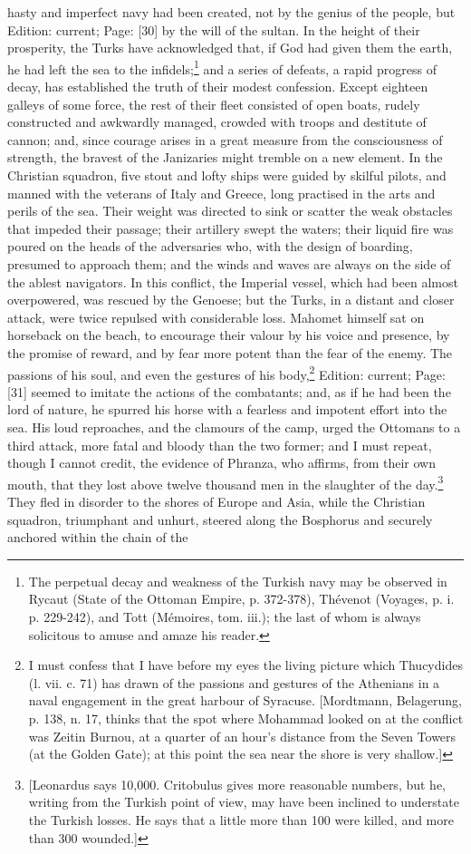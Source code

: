 hasty and imperfect navy had been created, not by the genius of the people, but Edition: current; Page: [30] by the will of the sultan. In the height of their prosperity, the Turks have acknowledged that, if God had given them the earth, he had left the sea to the infidels;\footnote{The perpetual decay and weakness of the Turkish navy may be observed in Rycaut (State of the Ottoman Empire, p. 372-378), Thévenot (Voyages, p. i. p. 229-242), and Tott (Mémoires, tom. iii.); the last of whom is always solicitous to amuse and amaze his reader.} and a series of defeats, a rapid progress of decay, has established the truth of their modest confession. Except eighteen galleys of some force, the rest of their fleet consisted of open boats, rudely constructed and awkwardly managed, crowded with troops and destitute of cannon; and, since courage arises in a great measure from the consciousness of strength, the bravest of the Janizaries might tremble on a new element. In the Christian squadron, five stout and lofty ships were guided by skilful pilots, and manned with the veterans of Italy and Greece, long practised in the arts and perils of the sea. Their weight was directed to sink or scatter the weak obstacles that impeded their passage; their artillery swept the waters; their liquid fire was poured on the heads of the adversaries who, with the design of boarding, presumed to approach them; and the winds and waves are always on the side of the ablest navigators. In this conflict, the Imperial vessel, which had been almost overpowered, was rescued by the Genoese; but the Turks, in a distant and closer attack, were twice repulsed with considerable loss. Mahomet himself sat on horseback on the beach, to encourage their valour by his voice and presence, by the promise of reward, and by fear more potent than the fear of the enemy. The passions of his soul, and even the gestures of his body,\footnote{I must confess that I have before my eyes the living picture which Thucydides (l. vii. c. 71) has drawn of the passions and gestures of the Athenians in a naval engagement in the great harbour of Syracuse. [Mordtmann, Belagerung, p. 138, n. 17, thinks that the spot where Mohammad looked on at the conflict was Zeitin Burnou, at a quarter of an hour\texthebrew{}’s distance from the Seven Towers (at the Golden Gate); at this point the sea near the shore is very shallow.]} Edition: current; Page: [31] seemed to imitate the actions of the combatants; and, as if he had been the lord of nature, he spurred his horse with a fearless and impotent effort into the sea. His loud reproaches, and the clamours of the camp, urged the Ottomans to a third attack, more fatal and bloody than the two former; and I must repeat, though I cannot credit, the evidence of Phranza, who affirms, from their own mouth, that they lost above twelve thousand men in the slaughter of the day.\footnote{[Leonardus says 10,000. Critobulus gives more reasonable numbers, but he, writing from the Turkish point of view, may have been inclined to understate the Turkish losses. He says that a little more than 100 were killed, and more than 300 wounded.]} They fled in disorder to the shores of Europe and Asia, while the Christian squadron, triumphant and unhurt, steered along the Bosphorus and securely anchored within the chain of the 